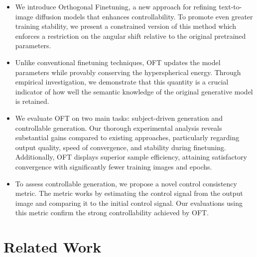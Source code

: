 \begin{itemize}[leftmargin=*,nosep]

    \item We introduce Orthogonal Finetuning, a new approach for refining text-to-image diffusion models that enhances controllability. To promote even greater training stability, we present a constrained version of this method which enforces a restriction on the angular shift relative to the original pretrained parameters.
    \item Unlike conventional finetuning techniques, OFT updates the model parameters while provably conserving the hyperspherical energy. Through empirical investigation, we demonstrate that this quantity is a crucial indicator of how well the semantic knowledge of the original generative model is retained.
    \item We evaluate OFT on two main tasks: subject-driven generation and controllable generation. Our thorough experimental analysis reveals substantial gains compared to existing approaches, particularly regarding output quality, speed of convergence, and stability during finetuning. Additionally, OFT displays superior sample efficiency, attaining satisfactory convergence with significantly fewer training images and epochs.
    \item To assess controllable generation, we propose a novel control consistency metric. The metric works by estimating the control signal from the output image and comparing it to the initial control signal. Our evaluations using this metric confirm the strong controllability achieved by OFT.
\end{itemize}

\section{Related Work}

